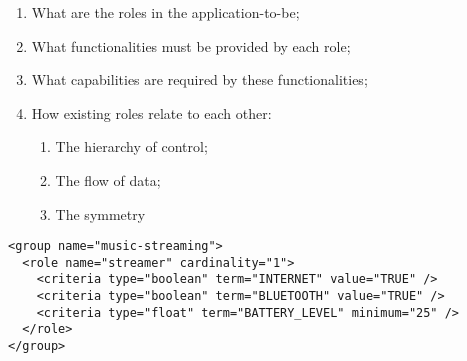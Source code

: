 \begin{enumerate}[label=\roman*]
	
	\item What are the roles in the application-to-be;
	
	\item What functionalities must be provided by each role;
	
	\item What capabilities are required by these functionalities; 
	
	
	\item How existing roles relate to each other: 
	
	\begin{enumerate}[label=-]
		
		\item The hierarchy of control;%
		
		\item The flow of data;%
	
		\item The symmetry%
		
	\end{enumerate}	
	
\end{enumerate}


\begin{lstlisting}[caption=Specification of the music streaming group, label=lst:ms_criteria, captionpos=b]
<group name="music-streaming">
  <role name="streamer" cardinality="1">
    <criteria type="boolean" term="INTERNET" value="TRUE" />
    <criteria type="boolean" term="BLUETOOTH" value="TRUE" />
    <criteria type="float" term="BATTERY_LEVEL" minimum="25" />
  </role>
</group>
\end{lstlisting}

